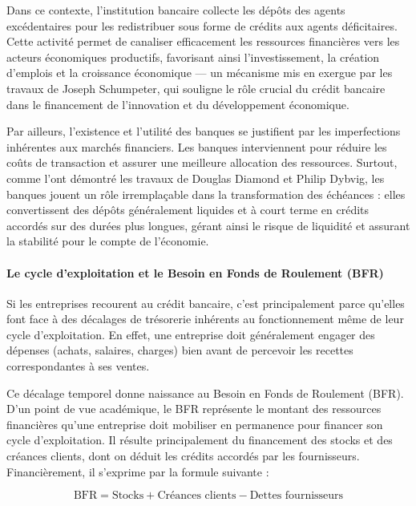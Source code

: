\documentclass[12pt,a4paper]{report}
\begin{document}
Dans ce contexte, l'institution bancaire collecte les dépôts des agents excédentaires pour les redistribuer sous forme de crédits aux agents déficitaires. Cette activité permet de canaliser efficacement les ressources financières vers les acteurs économiques productifs, favorisant ainsi l'investissement, la création d'emplois et la croissance économique --- un mécanisme mis en exergue par les travaux de Joseph Schumpeter, qui souligne le rôle crucial du crédit bancaire dans le financement de l'innovation et du développement économique.

Par ailleurs, l'existence et l'utilité des banques se justifient par les imperfections inhérentes aux marchés financiers. Les banques interviennent pour réduire les coûts de transaction et assurer une meilleure allocation des ressources. Surtout, comme l'ont démontré les travaux de Douglas Diamond et Philip Dybvig, les banques jouent un rôle irremplaçable dans la transformation des échéances : elles convertissent des dépôts généralement liquides et à court terme en crédits accordés sur des durées plus longues, gérant ainsi le risque de liquidité et assurant la stabilité pour le compte de l'économie.

\paragraph{Le cycle d'exploitation et le Besoin en Fonds de Roulement (BFR)}

Si les entreprises recourent au crédit bancaire, c'est principalement parce qu'elles font face à des décalages de trésorerie inhérents au fonctionnement même de leur cycle d'exploitation. En effet, une entreprise doit généralement engager des dépenses (achats, salaires, charges) bien avant de percevoir les recettes correspondantes à ses ventes.

Ce décalage temporel donne naissance au Besoin en Fonds de Roulement (BFR). D'un point de vue académique, le BFR représente le montant des ressources financières qu'une entreprise doit mobiliser en permanence pour financer son cycle d'exploitation. Il résulte principalement du financement des stocks et des créances clients, dont on déduit les crédits accordés par les fournisseurs. Financièrement, il s'exprime par la formule suivante :

\begin{equation}
  \text{BFR} = \text{Stocks} + \text{Créances clients} - \text{Dettes fournisseurs}
\end{equation}
\end{document}
